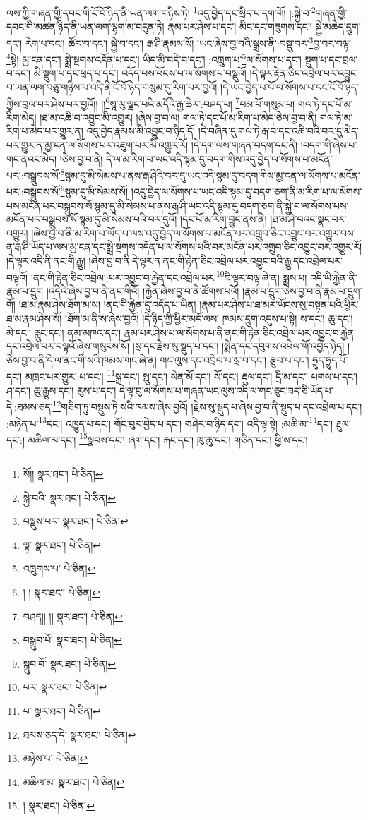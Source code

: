 ལས་ཀྱི་གཞན་གྱི་དབང་གི་ངོ་བོ་ཉིད་ནི་ཡན་ལག་གཉིས་ཏེ། \footnote{སོ།།   སྣར་ཐང་།  པེ་ཅིན། }འདུ་བྱེད་དང་སྲིད་པ་དག་གོ། །:སྐྱེ་བ་\footnote{སྐྱེ་བའི་  སྣར་ཐང་།  པེ་ཅིན། }གཞན་གྱི་དབང་གི་མཚན་ཉིད་ནི་ཡན་ལག་ལྷག་མ་བདུན་ཏེ། རྣམ་པར་ཤེས་པ་དང་། མིང་དང་གཟུགས་དང་། སྐྱེ་མཆེད་དྲུག་དང་། རེག་པ་དང་། ཚོར་བ་དང་། སྐྱེ་བ་དང་། རྒ་ཤི་རྣམས་སོ། །ཡང་ཞེས་བྱ་བའི་སྒྲས་ནི་:བསྡུ་བར་\footnote{བསྡུས་པར་  སྣར་ཐང་།  པེ་ཅིན། }བྱ་བར་བལྟ་\footnote{ལྟ་  སྣར་ཐང་།  པེ་ཅིན། }སྟེ། མྱ་ངན་དང་། སྨྲེ་སྔགས་འདོན་པ་དང་། ཡིད་མི་བདེ་བ་དང་། :འཁྲུག་པ་\footnote{འཁྲུགས་པ་  པེ་ཅིན། }ལ་སོགས་པ་དང་། སྡུག་པ་དང་བྲལ་བ་དང་། མི་སྡུག་པ་དང་ཕྲད་པ་དང་། འདོད་པས་ཕོངས་པ་ལ་སོགས་པ་བསྡུའོ། །དེ་ལྟར་རྟེན་ཅིང་འབྲེལ་པར་འབྱུང་བ་ཡན་ལག་བཅུ་གཉིས་པ་འདི་ནི་ངོ་བོ་ཉིད་གསུམ་དུ་རིག་པར་བྱའོ། །དེ་ཡང་བྱེད་པ་པོ་ལ་སོགས་པ་དང་ངོ་བོ་ཉིད་ཀྱིས་བྲལ་བར་ཤེས་པར་བྱའོ།། །།\footnote{། །  སྣར་ཐང་།  པེ་ཅིན། }སཱ་ལུ་ལྗང་པའི་མདོའི་རྒྱ་ཆེར་:བཤད་པ། \footnote{བཤད།། །།  སྣར་ཐང་།  པེ་ཅིན། }བམ་པོ་གསུམ་པ། གལ་ཏེ་དང་པོ་མ་རིག་མེད། །ཐ་མ་འཆི་བ་འབྱུང་མི་འགྱུར། །ཞེས་བྱ་བ་ལ། གལ་ཏེ་དང་པོ་མ་རིག་པ་མེད་ཅེས་བྱ་བ་ནི། གལ་ཏེ་མ་རིག་པ་མེད་པར་གྱུར་ན། འདུ་བྱེད་རྣམས་མི་འབྱུང་བ་ཉིད་དོ། །དེ་བཞིན་དུ་གལ་ཏེ་རྒ་བ་དང་འཆི་བའི་བར་དུ་མེད་པར་གྱུར་ན་མྱ་ངན་ལ་སོགས་པར་འཇུག་པར་མི་འགྱུར་རོ། །དེ་དག་ལས་གཞན་བདག་དང་ནི། །བདག་གི་ཞེས་པ་གང་ནའང་མེད། །ཅེས་བྱ་བ་ནི། དེ་ལ་མ་རིག་པ་ཡང་འདི་སྙམ་དུ་བདག་གིས་འདུ་བྱེད་ལ་སོགས་པ་མངོན་པར་:བསྒྲུབས་སོ་\footnote{བསྒྲུབ་པོ་  སྣར་ཐང་།  པེ་ཅིན། }སྙམ་དུ་མི་སེམས་པ་ནས་རྒ་ཤིའི་བར་དུ་ཡང་འདི་སྙམ་དུ་བདག་གིས་མྱ་ངན་ལ་སོགས་པ་མངོན་པར་:བསྒྲུབས་སོ་\footnote{སྒྲུབ་བོ་  སྣར་ཐང་།  པེ་ཅིན། }སྙམ་དུ་མི་སེམས་སོ། །འདུ་བྱེད་ལ་སོགས་པ་ཡང་འདི་སྙམ་དུ་བདག་ཅག་ནི་མ་རིག་པ་ལ་སོགས་པས་མངོན་པར་བསྒྲུབས་སོ་སྙམ་དུ་མི་སེམས་པ་ནས་རྒ་ཤི་ཡང་འདི་སྙམ་དུ་བདག་ཅག་ནི་སྐྱེ་བ་ལ་སོགས་པས་མངོན་པར་བསྒྲུབས་སོ་སྙམ་དུ་མི་སེམས་པའི་བར་དུའོ། །དང་པོ་མ་རིག་བྱུང་ནས་ནི། །ཐ་མ་ཤི་བའང་སྣང་བར་འགྱུར། །ཞེས་བྱ་བ་ནི་མ་རིག་པ་ཡོད་པ་ལས་འདུ་བྱེད་ལ་སོགས་པ་མངོན་པར་འགྲུབ་ཅིང་འབྱུང་བར་འགྱུར་བས་ན་རྒ་ཤི་ཡོད་པ་ལས་མྱ་ངན་དང་སྨྲེ་སྔགས་འདོན་པ་ལ་སོགས་པའི་བར་མངོན་པར་འགྲུབ་ཅིང་འབྱུང་བར་འགྱུར་རོ། །དེ་ལྟར་འདི་ནི་ནང་གི་རྒྱུ། །ཞེས་བྱ་བ་ནི་དེ་ལྟར་ན་ནང་གི་རྟེན་ཅིང་འབྲེལ་པར་འབྱུང་བའི་རྒྱུ་དང་འབྲེལ་པར་བལྟའོ། །ནང་གི་རྟེན་ཅིང་འབྲེལ་:པར་འབྱུང་བ་རྐྱེན་དང་འབྲེལ་པར་\footnote{པར་  སྣར་ཐང་།  པེ་ཅིན། }ཇི་ལྟར་བལྟ་ཞེ་ན། སྨྲས་པ། འདི་ཡི་རྐྱེན་ནི་རྣམ་པ་དྲུག །འདིའི་ཞེས་བྱ་བ་ནི་ནང་གིའོ། །རྐྱེན་ཞེས་བྱ་བ་ནི་ཚོགས་པའོ། །རྣམ་པ་དྲུག་ཅེས་བྱ་བ་ནི་རྣམ་པ་དྲུག་གོ། །ཐ་མ་རྣམ་ཤེས་ཐོག་མ་ས། །ནང་གི་རྐྱེན་དུ་འདོད་པ་ཡིན། །རྣམ་པར་ཤེས་པ་ཐ་མར་ཡོངས་སུ་བསྟན་པའི་ཕྱིར་ཐ་མ་རྣམ་ཤེས་སོ། །ཐོག་མ་ནི་ས་ཞེས་བྱའོ། །དེ་ཉིད་ཀྱི་ཕྱིར་མདོ་ལས། ཁམས་དྲུག་འདུས་པ་སྟེ། ས་དང་། ཆུ་དང་། མེ་དང་། རླུང་དང་། ནམ་མཁའ་དང་། རྣམ་པར་ཤེས་པ་ལ་སོགས་པ་ནི་ནང་གི་རྟེན་ཅིང་འབྲེལ་པར་འབྱུང་བ་རྐྱེན་དང་འབྲེལ་པར་བལྟའོ་ཞེས་གསུངས་སོ། །སྲ་དང་རྗེས་སུ་སྡུད་པ་དང་། །སྨིན་དང་དབུགས་འཕེལ་གོ་འབྱེད་ཉིད། །ཅེས་བྱ་བ་ནི་དེ་ལ་ནང་གི་སའི་ཁམས་གང་ཞེ་ན། གང་ལུས་དང་འབྲེལ་པ་སྲ་བ་དང་། རྩུབ་པ་དང་། ཧྲུད་ཧྲུད་པོ་དང་། མཁྲང་པར་གྱུར་:པ་དང་། \footnote{པ་  སྣར་ཐང་།  པེ་ཅིན། }སྐྲ་དང་། སྤུ་དང་། སེན་མོ་དང་། སོ་དང་། རྡུལ་དང་། དྲི་མ་དང་། པགས་པ་དང་། ཤ་དང་། ཆུ་རྒྱུས་དང་། རུས་པ་དང་། དེ་ལྟ་བུ་ལ་སོགས་པ་གཞན་ཡང་ལུས་འདི་ལ་གང་ཅུང་ཟད་ཅི་ཡོད་པ་དེ་:ཐམས་ཅད་\footnote{ཐམས་ཅད་དེ་  སྣར་ཐང་།  པེ་ཅིན། }གཅིག་ཏུ་བསྡུས་ཏེ་སའི་ཁམས་ཞེས་བྱའོ། །རྗེས་སུ་སྡུད་པ་ཞེས་བྱ་བ་ནི་སྡུད་པ་དང་འབྲེལ་པ་དང་། :མཉེན་པ་\footnote{མཉེས་པ་  པེ་ཅིན། }དང་། འཁྱུད་པ་དང་། གོང་བུར་བྱེད་པ་དང་། གཤེར་བ་ཉིད་དང་། འདི་ལྟ་སྟེ། :མཆི་མ་\footnote{མཆིལ་མ་  སྣར་ཐང་།  པེ་ཅིན། }དང་། རྔུལ་དང་:། མཆིལ་མ་དང་། \footnote{།    སྣར་ཐང་།  པེ་ཅིན། }སྣབས་དང་། ཞག་དང་། རྐང་དང་། ཁུ་ཆུ་དང་། གཅིན་དང་། ཕྱི་ས་དང་། 